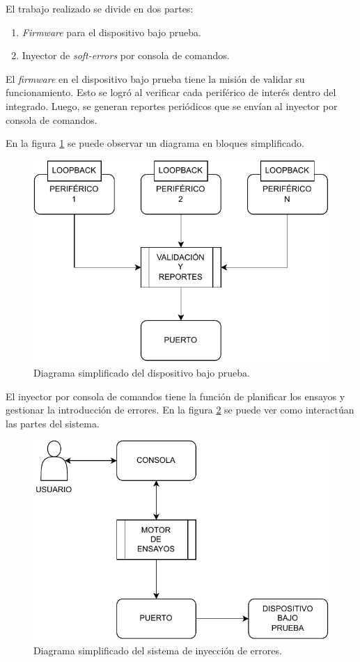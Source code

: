 El trabajo realizado se divide en dos partes:
\begin{enumerate}
    \item \emph{Firmware} para el dispositivo bajo prueba.
    \item Inyector de \emph{soft-errors} por consola de comandos.
\end{enumerate}

El \emph{firmware} en el dispositivo bajo prueba tiene la misión de validar su funcionamiento.
Esto se logró al verificar cada periférico de interés dentro del integrado.
Luego, se generan reportes periódicos que se envían al inyector por consola de comandos.

En la figura \ref{fig:dutsimple} se puede observar un diagrama en bloques simplificado.

\begin{figure}[htbp]
	\centering
	\includegraphics[width=\textwidth]{./Figures/dutsimple.pdf}
    \caption{Diagrama simplificado del dispositivo bajo prueba.}
	\label{fig:dutsimple}
\end{figure}

El inyector por consola de comandos tiene la función de planificar los ensayos y gestionar la introducción de errores.
En la figura \ref{fig:sisesimple} se puede ver como interactúan las partes del sistema.

\begin{figure}[htbp]
	\centering
	\includegraphics[width=\textwidth]{./Figures/sisesimple.pdf}
    \caption{Diagrama simplificado del sistema de inyección de errores.}
	\label{fig:sisesimple}
\end{figure}

